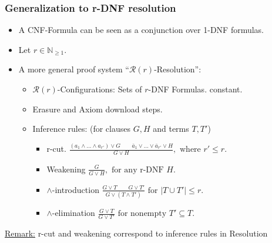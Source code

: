 \documentclass[t,usenames,dvipsnames]{beamer}
\begin{document}
\begin{frame}\frametitle{Generalization to r-DNF resolution}
	\begin{itemize}[<+->]
		\item A CNF-Formula can be seen as a conjunction over 1-DNF formulas.
		\item Let $r \in \mathbb{N}_{\geq 1}$.
		\item A more general proof system ``$\mathcal{R}(r)$-Resolution'':
		\begin{itemize}
			\item $\mathcal{R}(r)$-Configurations: Sets of $r$-DNF Formulas.
				constant.
			\item Erasure and Axiom download steps.
			\item Inference rules: (for clauses $G, H$ and terms $T, T'$)
			\begin{itemize}
				\item r-cut. $\displaystyle \frac{(a_1\land\dots \land a_{r'})\lor G
					\qquad \overline{a}_1 \lor \dots \lor \overline{a}_{r'} \lor
					H}{G\lor H}, \text{ where }r'\leq r$.
				\item Weakening $\displaystyle \frac{G}{G\lor H}, \text{ for any
					r-DNF } H.$
				\item $\land$-introduction $\displaystyle \frac{G\lor T \qquad G
					\lor T'}{G \lor (T \land T')} \text{ for }
					|T\cup T'| \leq r$.
				 \item $\land$-elimination $\displaystyle \frac{G\lor T}{G \lor T'}
					 \text{ for nonempty } T' \subseteq T$.
			\end{itemize}
		\end{itemize}
	\end{itemize}

	\pause
	\underline{Remark:} r-cut and weakening correspond to inference rules in Resolution
\end{frame}
\end{document}
